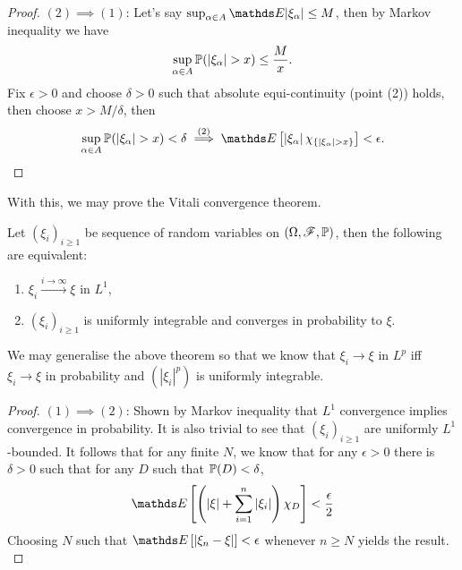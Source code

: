 \begin{unexaminable}
\begin{proof}
$(2) \implies (1)$: Let's say $\sup_{\alpha \in A} \E|\xi_\alpha| \leq M$, then by Markov inequality we have
\begin{equation}
    \sup_{\alpha \in A} \mathbb{P}(|\xi_\alpha| > x) \leq \frac{M}{x}.
\end{equation}
Fix $\epsilon > 0$ and choose $\delta > 0$ such that absolute equi-continuity (point (2)) holds, then choose $x > M/\delta$, then 
\begin{equation}
    \sup_{\alpha \in A} \p(|\xi_\alpha| > x) < \delta \overset{(2)}{\implies} \E\sqbracket{\abs{\xi_\alpha} \chi_{\set{|\xi_\alpha|>x}}} < \epsilon.
\end{equation}
\end{proof}

With this, we may prove the Vitali convergence theorem.
\begin{theorem} \label{thm:vitali_convergence}
Let $(\xi_i)_{i\geq 1}$ be sequence of random variables on $(\Omega,\mathcal{F},\mathbb{P})$, then the following are equivalent:
\begin{enumerate}
    \item $\xi_i \overset{i\to\infty}\to \xi$ in $L^1$,
    \item $(\xi_i)_{i\geq 1}$ is uniformly integrable and converges in probability to $\xi$.
\end{enumerate}
\end{theorem}

\begin{remark}
We may generalise the above theorem so that we know that $\xi_i \to \xi$ in $L^p$ iff $\xi_i \to \xi$ in probability and $(|\xi_i|^p)$ is uniformly integrable.
\end{remark}

\begin{proof} 
$(1) \implies (2)$: Shown by Markov inequality that $L^1$ convergence implies convergence in probability. It is also trivial to see that $(\xi_i)_{i\geq 1}$ are uniformly $L^1$-bounded. It follows that for any finite $N$, we know that for any $\epsilon > 0$ there is $\delta > 0$ such that for any $D$ such that $\mathbb{P}(D)<\delta$, 
\begin{equation}
    \E\sqbracket{\bracket{\abs{\xi}+\sum_{i=1}^n \abs{\xi_i}}\chi_D} < \frac{\epsilon}{2}
\end{equation}
Choosing $N$ such that $\E\sqbracket{|\xi_n - \xi|} < \epsilon$ whenever $n \geq N$ yields the result.
\\


\end{proof}
\end{unexaminable}
